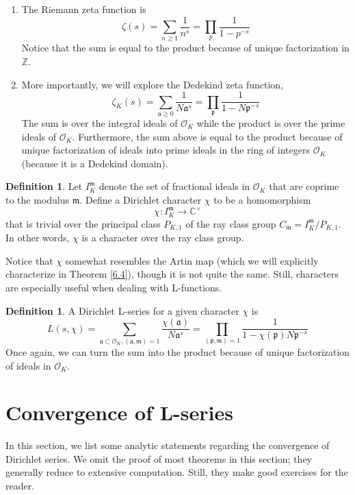 \documentclass{article}
\newcommand{\CC}{\mathbb{C}}
\newcommand{\ZZ}{\mathbb{Z}}
\theoremstyle{plain}
\theoremstyle{definition}
\newtheorem{defn}[thm]{Definition}
\theoremstyle{remark}
\numberwithin{equation}{section}
\numberwithin{thm}{section}
\begin{document}
\begin{enumerate}
    \item The Riemann zeta function is $$\zeta(s) = \sum_{n \ge 1} \frac{1}{n^s} = \prod_{p} \frac{1}{1 - p^{-s}}$$ Notice that the sum is equal to the product because of unique factorization in $\ZZ$.
    \item More importantly, we will explore the Dedekind zeta function, $$\zeta_{K}(s) = \sum_{\mathfrak{a} \ge 0} \frac{1}{N\mathfrak{a}^s} = \prod_{\mathfrak{p}} \frac{1}{1 - N\mathfrak{p}^{-s}}$$ The sum is over the integral ideals of $\mathcal{O}_K$ while the product is over the prime ideals of $\mathcal{O}_K$. Furthermore, the sum above is equal to the product because of unique factorization of ideals into prime ideals in the ring of integers $\mathcal{O}_K$ (because it is a Dedekind domain).
\end{enumerate}

\begin{defn}
Let $I_{K}^{\mathfrak{m}}$ denote the set of fractional ideals in $\mathcal{O}_K$ that are coprime to the modulus $\mathfrak{m}$. Define a Dirichlet character $\chi$ to be a homomorphism $$\chi: I_{K}^{\mathfrak{m}} \longrightarrow \CC^{\times}$$ that is trivial over the principal class $P_{K, 1}$ of the ray class group $C_{\mathfrak{m}} = I_{K}^{\mathfrak{m}}/P_{K, 1}$. In other words, $\chi$ is a character over the ray class group.
\end{defn}

Notice that $\chi$ somewhat resembles the Artin map (which we will explicitly characterize in Theorem \ref{6.4}), though it is not quite the same. Still, characters are especially useful when dealing with L-functions.

\begin{defn}
A Dirichlet L-series for a given character $\chi$ is $$L(s, \chi) = \sum_{\mathfrak{a} \subset \mathcal{O}_K, (\mathfrak{a}, \mathfrak{m}) = 1} \frac{\chi(\mathfrak{a})}{N\mathfrak{a}^s} = \prod_{(\mathfrak{p}, \mathfrak{m}) = 1} \frac{1}{1 - \chi(\mathfrak{p})N\mathfrak{p}^{-s}}$$ Once again, we can turn the sum into the product because of unique factorization of ideals in $\mathcal{O}_K$.
\end{defn}

\section{Convergence of L-series}

In this section, we list some analytic statements regarding the convergence of Dirichlet series. We omit the proof of most theorems in this section; they generally reduce to extensive computation. Still, they make good exercises for the reader. 
\end{document}
